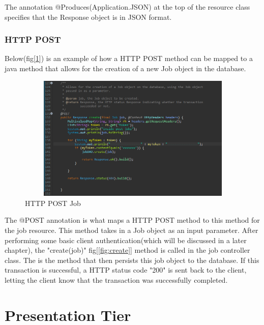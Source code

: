The annotation @Produces(Application.JSON) at the top of the resource class specifies that the Response object is in JSON format.



\subsubsection{HTTP POST}
\label{sec:SystemDesignPOST}

Below(fig[\ref{fig:postHTTP}]) is an example of how a HTTP POST method can be mapped to a java method that allows for the creation of a new Job object in the database.

\begin{figure}[H]
    \centering
    \includegraphics[width=350pt, height=170pt]{DesignImages/JobPOST.PNG}
    \caption{HTTP POST Job}
    \label{fig:postHTTP}
\end{figure}

\bigskip

The @POST annotation is what maps a HTTP POST method to this method for the job resource. This method takes in a Job object as an input parameter. After performing some basic client authentication(which will be discussed in a later chapter), the "create(job)" fig[\ref{fig:create}] method is called in the job controller class. The is the method that then persists this job object to the database. If this transaction is successful, a HTTP status code "200" is sent back to the client, letting the client know that the transaction was successfully completed.


\section{Presentation Tier}
\label{sec:SystemDesignPresentationTier}

